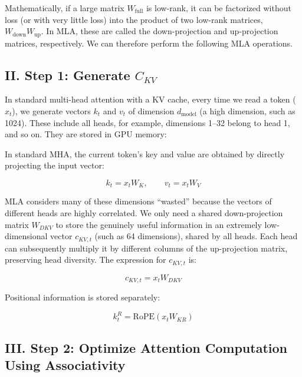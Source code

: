 Mathematically, if a large matrix \(W_{\mathrm{full}}\) is low-rank, it can be factorized without loss (or with very little loss) into the product of two low-rank matrices, \(W_{\mathrm{down}}W_{\mathrm{up}}\). In MLA, these are called the down-projection and up-projection matrices, respectively. We can therefore perform the following MLA operations.

\hypertarget{ii.-step-1-generate-c_kv}{%
\subsection{\texorpdfstring{II. Step 1: Generate \(C_{KV}\)}{II. Step 1: Generate C\_\{KV\}}}\label{ii.-step-1-generate-c_kv}}

In standard multi-head attention with a KV cache, every time we read a token (\(x_t\)), we generate vectors \(k_t\) and \(v_t\) of dimension \(d_{\mathrm{model}}\) (a high dimension, such as 1024). These include all heads, for example, dimensions 1--32 belong to head 1, and so on. They are stored in GPU memory:

In standard MHA, the current token's key and value are obtained by directly projecting the input vector:

\[
k_t = x_t W_K,\qquad v_t = x_t W_V
\]

MLA considers many of these dimensions ``wasted'' because the vectors of different heads are highly correlated. We only need a shared down-projection matrix \(W_{DKV}\) to store the genuinely useful information in an extremely low-dimensional vector \(c_{KV,t}\) (such as 64 dimensions), shared by all heads. Each head can subsequently multiply it by different columns of the up-projection matrix, preserving head diversity. The expression for \(c_{KV,t}\) is:

\[
c_{KV,t} = x_t W_{DKV}
\]

Positional information is stored separately:

\[
k_t^R = \mathrm{RoPE}(x_t W_{KR})
\]

\hypertarget{iii.-step-2-optimize-attention-computation-using-associativity}{%
\subsection{III. Step 2: Optimize Attention Computation Using Associativity}\label{iii.-step-2-optimize-attention-computation-using-associativity}}

